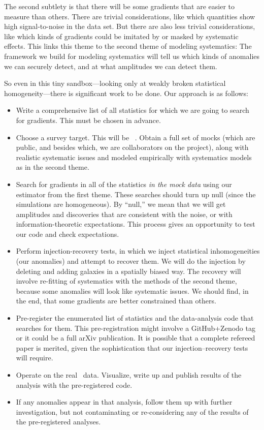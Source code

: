 \documentclass[12pt, fullpage, letterpaper]{article}
\begin{document}
The second subtlety is that there will be some gradients that are easier
to measure than others. There are trivial considerations, like which
quantities show high signal-to-noise in the data set. But there are also less
trivial considerations, like which kinds of gradients could be imitated by or
masked by systematic effects.
This links this theme to the second theme of modeling systematics:
The framework we build for modeling systematics will tell us which
kinds of anomalies we can securely detect, and at what amplitudes we
can detect them.

So even in this tiny sandbox---looking only at weakly broken
statistical homogeneity---there is significant work to be done.
Our approach is as follows:
\begin{itemize}
\item
Write a comprehensive list of all statistics for which we are going to search
for gradients. This must be chosen in advance.
\item
Choose a survey target. This will be
\SDSSIV\ \eBOSS. Obtain a full set of mocks (which are public, and besides which, we are collaborators on the project), along
with realistic systematic issues and modeled empirically with
systematics models as in the second theme.
\item
Search for gradients in all of the statistics \emph{in the mock
data} using our estimator from the first theme.
These searches should turn up null (since the simulations are
homogeneous). By ``null,'' we mean
that we will get amplitudes and discoveries that are consistent with the noise, or with
information-theoretic expectations.
This process gives an
opportunity to test our code and check expectations.
\item
Perform injection-recovery tests, in which we inject statistical inhomogeneities (our anomalies)
and attempt to recover them.
We will do the injection by deleting and adding galaxies in a
spatially biased way.
The recovery will involve re-fitting of systematics with the methods of the second
theme, because some anomalies will look like systematic issues.
We should find, in the end, that some gradients are better constrained than others.
\item
Pre-register the enumerated list of statistics and the data-analysis code that
searches for them.
This pre-registration might involve a GitHub+Zenodo tag or it could be
a full arXiv publication. It is possible that a complete refereed paper
is merited, given the sophistication that our injection--recovery tests will require.
\item
Operate on the real \eBOSS\ data. Visualize, write up and publish results of the
analysis with the pre-registered code.
\item
If any anomalies appear in that analysis, follow them up with further
investigation, but not contaminating or re-considering any of the results
of the pre-registered analyses.
\end{itemize}
\end{document}
